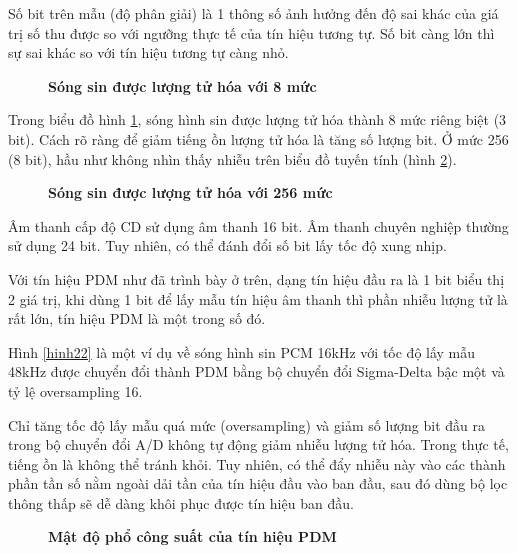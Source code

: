 Số bit trên mẫu (độ phân giải) là 1 thông số ảnh hưởng đến độ sai khác của giá trị số thu được so với ngưỡng thực tế của tín hiệu tương tự. Số bit càng lớn thì sự sai khác so với tín hiệu tương tự càng nhỏ.

\begin{figure}[!ht]
    \centering
    
    \caption[Sóng sin được lượng tử hóa với 8 mức]{\bfseries \fontsize{12pt}{0pt}\selectfont Sóng sin được lượng tử hóa với 8 mức}
    \label{h_quantization_noise_8}
\end{figure}
Trong biểu đồ hình \ref{h_quantization_noise_8}, sóng hình sin được lượng tử hóa thành 8 mức riêng biệt (3 bit). Cách rõ ràng để giảm tiếng ồn lượng tử hóa là tăng số lượng bit. Ở mức 256 (8 bit), hầu như không nhìn thấy nhiễu trên biểu đồ tuyến tính (hình \ref{h_quantization_noise_256}).

\begin{figure}[!ht]
    \centering
    
    \caption[Sóng sin được lượng tử hóa với 256 mức]{\bfseries \fontsize{12pt}{0pt}\selectfont Sóng sin được lượng tử hóa với 256 mức}
    \label{h_quantization_noise_256}
\end{figure}

Âm thanh cấp độ CD sử dụng âm thanh 16 bit. Âm thanh chuyên nghiệp thường sử dụng 24 bit. Tuy nhiên, có thể đánh đổi số bit lấy tốc độ xung nhịp.

Với tín hiệu PDM như đã trình bày ở trên, dạng tín hiệu đầu ra là 1 bit biểu thị 2 giá trị, khi dùng 1 bit để lấy mẫu tín hiệu âm thanh thì phần nhiễu lượng tử là rất lớn, tín hiệu PDM là một trong số đó.

Hình \ref{hinh22} là một ví dụ về sóng hình sin PCM 16kHz với tốc độ lấy mẫu 48kHz được chuyển đổi thành PDM bằng bộ chuyển đổi Sigma-Delta bậc một và tỷ lệ oversampling 16.

Chỉ tăng tốc độ lấy mẫu quá mức (oversampling) và giảm số lượng bit đầu ra trong bộ chuyển đổi A/D không tự động giảm nhiễu lượng tử hóa. Trong thực tế, tiếng ồn là không thể tránh khỏi. Tuy nhiên, có thể đẩy nhiễu này vào các thành phần tần số nằm ngoài dải tần của tín hiệu đầu vào ban đầu, sau đó dùng bộ lọc thông thấp sẽ dễ dàng khôi phục được tín hiệu ban đầu.
\begin{figure}[!ht]
    \centering
    
    \caption[Mật độ phổ công suất của tín hiệu PDM]{\bfseries \fontsize{12pt}{0pt}\selectfont Mật độ phổ công suất của tín hiệu PDM}
    \label{sinewave_pdm_psd}
\end{figure}

